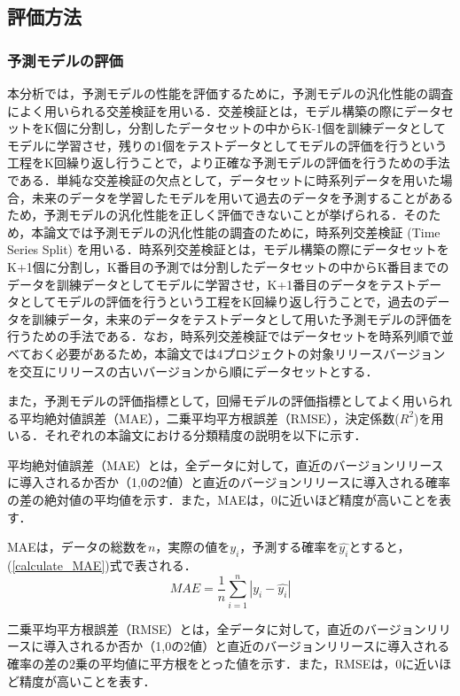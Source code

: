\documentclass[submit,ses,noauthor]{ipsj}
\begin{document}
\subsection{評価方法}

\subsubsection{予測モデルの評価}
本分析では，予測モデルの性能を評価するために，予測モデルの汎化性能の調査によく用いられる交差検証を用いる．交差検証とは，モデル構築の際にデータセットをK個に分割し，分割したデータセットの中からK-1個を訓練データとしてモデルに学習させ，残りの1個をテストデータとしてモデルの評価を行うという工程をK回繰り返し行うことで，より正確な予測モデルの評価を行うための手法である．単純な交差検証の欠点として，データセットに時系列データを用いた場合，未来のデータを学習したモデルを用いて過去のデータを予測することがあるため，予測モデルの汎化性能を正しく評価できないことが挙げられる．そのため，本論文では予測モデルの汎化性能の調査のために，時系列交差検証 (Time Series Split) を用いる．時系列交差検証とは，モデル構築の際にデータセットをK+1個に分割し，K番目の予測では分割したデータセットの中からK番目までのデータを訓練データとしてモデルに学習させ，K+1番目のデータをテストデータとしてモデルの評価を行うという工程をK回繰り返し行うことで，過去のデータを訓練データ，未来のデータをテストデータとして用いた予測モデルの評価を行うための手法である．なお，時系列交差検証ではデータセットを時系列順で並べておく必要があるため，本論文では4プロジェクトの対象リリースバージョンを交互にリリースの古いバージョンから順にデータセットとする．

また，予測モデルの評価指標として，回帰モデルの評価指標としてよく用いられる平均絶対値誤差（MAE），二乗平均平方根誤差（RMSE），決定係数(\(R^{2}\))を用いる．それぞれの本論文における分類精度の説明を以下に示す．

平均絶対値誤差（MAE）とは，全データに対して，直近のバージョンリリースに導入されるか否か（1,0の2値）と直近のバージョンリリースに導入される確率の差の絶対値の平均値を示す．また，MAEは，0に近いほど精度が高いことを表す．

MAEは，データの総数を\(n\)，実際の値を\(y_{i}\)，予測する確率を\(\hat{y_{i}}\)とすると，(\ref{calculate_MAE})式で表される．
\begin{equation}
\label{calculate_MAE}
 MAE = \frac{1}{n}\sum^{n}_{i=1}|y_{i} - \hat{y_{i}}|
\end{equation}

二乗平均平方根誤差（RMSE）とは，全データに対して，直近のバージョンリリースに導入されるか否か（1,0の2値）と直近のバージョンリリースに導入される確率の差の2乗の平均値に平方根をとった値を示す．また，RMSEは，0に近いほど精度が高いことを表す．
\end{document}
